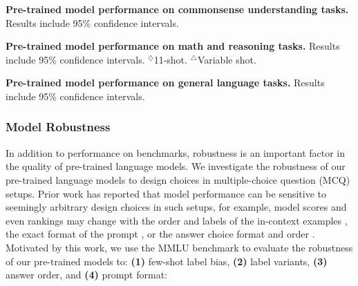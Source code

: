 \begin{table}
\centering

\caption{\textbf{Pre-trained model performance on commonsense understanding tasks.} Results include 95\% confidence intervals.}
\label{table:full_results_pretraining_commonsense}
\end{table}

\begin{table}
\centering

\caption{\textbf{Pre-trained model performance on math and reasoning tasks.} Results include 95\% confidence intervals. $^\diamondsuit$11-shot. $^\triangle$Variable shot.}
\label{table:full_results_math_reasoning}
\end{table}

\begin{table}
\centering
    
    \caption{\textbf{Pre-trained model performance on general language tasks.} Results include 95\% confidence intervals.}
\label{table:full_results_general}
\end{table}



\subsubsection{Model Robustness}\label{subsec:robustness}

In addition to performance on benchmarks, robustness is an important factor in the quality of pre-trained language models.
We investigate the robustness of our pre-trained language models to design choices in multiple-choice question (MCQ) setups.
Prior work has reported that model performance can be sensitive to seemingly arbitrary design choices in such setups, for example, model scores and even rankings may change with the order and labels of the in-context examples \citep[]{lu-etal-2022-fantastically,zhao2021calibrate,robison2023leveraging,liang2022holistic,gupta2024changinganswerorderdecrease}, the exact format of the prompt \citep{weber2023icl,mishra-etal-2022-reframing}, or the answer choice format and order \citep{alzahrani2024when,wang2024beyond,zheng2023large}.
Motivated by this work, we use the MMLU benchmark to evaluate the robustness of our pre-trained models to: \textbf{(1)} few-shot label bias, \textbf{(2)} label variants, \textbf{(3)} answer order, and \textbf{(4)} prompt format:

